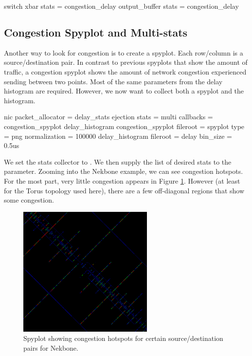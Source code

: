 \begin{ViFile}
switch {
 xbar {
   stats = congestion_delay
 }
 output_buffer {
  stats = congestion_delay
 }
}
\end{ViFile}

\subsection{Congestion Spyplot and Multi-stats}
\label{subsec:congestionSpyplot}

Another way to look for congestion is to create a spyplot.
Each row/column is a source/destination pair.
In contrast to previous spyplots that show the amount of traffic,
a congestion spyplot shows the amount of network congestion experienced sending between two points.
Most of the same parameters from the delay histogram are required.
However, we now want to collect both a spyplot and the histogram.

\begin{ViFile}
nic {
 packet_allocator = delay_stats
 ejection {
  stats = multi
  callbacks = congestion_spyplot delay_histogram
  congestion_spyplot {
   fileroot = spyplot
   type = png
   normalization = 100000
  }
  delay_histogram {
   fileroot = delay
   bin_size = 0.5us
  }
 }
}
\end{ViFile}

We set the stats collector to .
We then supply the list of desired stats to the  parameter.
Zooming into the Nekbone example, we can see congestion hotspots.
For the most part, very little congestion appears in Figure \ref{fig:nekboneCongestionSpyplot}.
However (at least for the Torus topology used here),
there are a few off-diagonal regions that show some congestion.

\begin{figure}
\centering
\includegraphics[width=0.6\textwidth]{figures/congestionSpyplotNekbone}
\caption{Spyplot showing congestion hotspots for certain source/destination pairs for Nekbone.}
\label{fig:nekboneCongestionSpyplot}
\end{figure}



